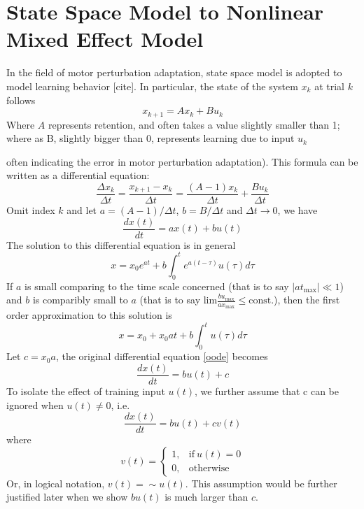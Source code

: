 \section{State Space Model to Nonlinear Mixed Effect Model}
In the field of motor perturbation adaptation, state space model is adopted to model learning behavior [cite]. 
In particular, the state of the system $ x_k $ at trial $ k $ follows 
\begin{equation}\label{ssm}
	x_{k+1} = Ax_k + Bu_k
\end{equation}
Where $ A $ represents retention, and often takes a value slightly smaller than 1; 
where as B, slightly bigger than 0, represents learning due to input $ u_k $ {often indicating the error in motor perturbation adaptation).
This formula can be written as a differential equation:
\begin{equation}
	\frac{\Delta x_k}{\Delta t} = \frac{x_{k+1}-x_k}{\Delta t} = \frac{(A-1)x_k}{\Delta t} + \frac{Bu_k}{\Delta t}
\end{equation}
Omit index $ k $ and let $ a = (A-1)/\Delta t $, $ b = B/\Delta t $ and $ \Delta t\rightarrow 0 $, we have
\begin{equation}\label{oode}
	\frac{dx(t)}{dt} = ax(t)+bu(t)
\end{equation}
The solution to this differential equation is in general
\begin{equation}\label{generalsolution}
	x = x_0e^{at} + b\int_0^t e^{a(t-\tau)}u(\tau)d\tau
\end{equation}
If $ a $ is small comparing to the time scale concerned (that is to say $ |at_{\text{max}}| \ll 1 $) and $ b $ is comparibly small to $ a $ (that is to say $ \text{lim}\frac{bu_\text{max}}{ax_\text{max}} \leqslant \text{const.} $), then the first order approximation to this solution is
\begin{equation}\label{specialsolution}
	x = x_0 + x_0at + b \int_0^t u(\tau)d\tau
\end{equation}
Let $ c=x_0 a $, the original differential equation \ref{oode} becomes
\begin{equation}
	\frac{dx(t)}{dt} = bu(t) + c
\end{equation}
To isolate the effect of training input $ u(t) $, we further assume that c can be ignored when $ u(t) \neq 0 $, i.e.
\begin{equation}\label{fode}
	\frac{dx(t)}{dt} = bu(t) + cv(t)
\end{equation}
where
\begin{equation}
v(t) = 
\begin{cases}
	1, & \text{if}\ u(t) = 0 \\
	0, & \text{otherwise}
\end{cases}
\end{equation}
Or, in logical notation, $ v(t) = \sim u(t) $. 
This assumption would be further justified later when we show $ bu(t) $ is much larger than $ c $.

}

